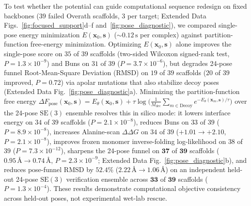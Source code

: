\documentclass[10pt,twocolumn]{article}
\begin{document}
To test whether the potential can guide computational sequence redesign on fixed backbones ($39$ failed Overath scaffolds, $3$ per target; Extended Data Figs.~\ref{fig:focused_support}d--f and~\ref{fig:pose_diagnostic}), we compared single-pose energy minimization $E(\mathbf{x}_0, \mathbf{s})$ ($\sim 0.12\,\text{s}$ per complex) against partition-function free-energy minimization. Optimizing $E(\mathbf{x}_0, \mathbf{s})$ alone improves the single-pose score on $35$ of $39$ scaffolds (two-sided Wilcoxon signed-rank test, $P = 1.3\times 10^{-9}$) and Buns on $31$ of $39$ ($P = 3.7\times 10^{-6}$), but degrades 24-pose funnel Root-Mean-Square Deviation (RMSD) on $19$ of $39$ scaffolds ($20$ of $39$ improved, $P = 0.72$) via apolar mutations that also stabilize decoy poses (Extended Data Fig.~\ref{fig:pose_diagnostic}a). Minimizing the partition-function free energy $\Delta F_{\text{pose}}(\mathbf{x}_0, \mathbf{s}) = E_\theta(\mathbf{x}_0, \mathbf{s}) + \tau \log\!\big(\frac{1}{M_{\text{dec}}}\sum_{m \in \text{Decoy}} e^{-E_\theta(\mathbf{x}_m, \mathbf{s})/\tau}\big)$ over the 24-pose $\text{SE}(3)$ ensemble resolves this in silico mode: it lowers interface energy on $34$ of $39$ scaffolds ($P = 2.1\times 10^{-8}$), reduces Buns on $33$ of $39$ ($P = 8.9\times 10^{-8}$), increases Alanine-scan $\Delta\Delta G$ on $34$ of $39$ ($+1.01 \to +2.10$, $P = 2.1\times 10^{-8}$), improves frozen monomer inverse-folding log-likelihood on $38$ of $39$ ($P = 7.3\times 10^{-12}$), sharpens the 24-pose funnel on $\mathbf{37}$ of $\mathbf{39}$ scaffolds ($0.95\,\text{\AA} \to 0.74\,\text{\AA}$, $P = 2.3\times 10^{-9}$; Extended Data Fig.~\ref{fig:pose_diagnostic}b), and reduces pose-funnel RMSD by $52.4\%$ ($2.22\,\text{\AA} \to 1.06\,\text{\AA}$) on an independent held-out 24-pose $\text{SE}(3)$ verification ensemble across $\mathbf{33}$ of $\mathbf{39}$ scaffolds ($P = 1.3\times 10^{-4}$). These results demonstrate computational objective consistency across held-out poses, not experimental wet-lab rescue.
\end{document}
